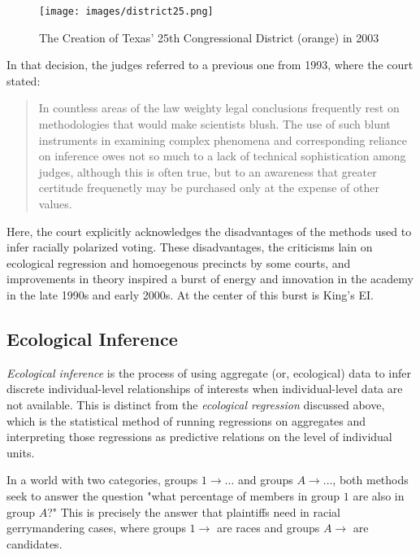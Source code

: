 \documentclass[fleqn,10pt]{style}
\begin{document}
\begin{figure}[ht]\centering
 \texttt{[image: images/district25.png]}
 \caption{The Creation of Texas' 25th Congressional District (orange) in 2003\cite{district25}}
 \label{fig:district25}
\end{figure}

In that decision, the judges referred to a previous one from 1993, where the court stated:

\begin{quote}
 In countless areas of the law weighty legal conclusions frequently rest on methodologies that would make scientists blush. The use of such blunt instruments in examining complex phenomena and corresponding reliance on inference owes not so much to a lack of technical sophistication among judges, although this is often true, but to an awareness that greater certitude frequenetly may be purchased only at the expense of other values.\cite{clements}
\end{quote}

Here, the court explicitly acknowledges the disadvantages of the methods used to infer racially polarized voting. These disadvantages, the criticisms lain on ecological regression and homoegenous precincts by some courts, and improvements in theory inspired a burst of energy and innovation in the academy in the late 1990s and early 2000s. At the center of this burst is King's EI.

\subsection{Ecological Inference}

\textit{Ecological inference} is the process of using aggregate (or, ecological) data to infer discrete individual-level relationships of interests when individual-level data are not available.\cite{king1999} This is distinct from the \textit{ecological regression} discussed above, which is the statistical method of running regressions on aggregates and interpreting those regressions as predictive relations on the level of individual units.\cite{ec_reg}

In a world with two categories, groups $1 \rightarrow \dots$ and groups $A \rightarrow \dots$, both methods seek to answer the question "what percentage of members in group $1$ are also in group $A$?" This is precisely the answer that plaintiffs need in racial gerrymandering cases, where groups $1 \rightarrow$ are races and groups $A \rightarrow$ are candidates.
\end{document}
